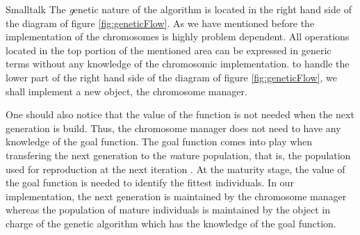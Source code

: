 \begin{displaycode}{Smalltalk}
The {\textsl genetic} nature of the algorithm is located in the right
hand side of the diagram of figure \ref{fig:geneticFlow}. As we
have mentioned before the implementation of the chromosomes is
highly problem dependent. All operations located in the top
portion of the mentioned area can be expressed in generic terms
without any knowledge of the chromosomic implementation. to handle
the lower part of the right hand side of the diagram of figure
\ref{fig:geneticFlow}, we shall implement a new object, the
chromosome manager.

One should also notice that the value of the function is not
needed when the next generation is build. Thus, the chromosome
manager does not need to have any knowledge of the goal function.
The goal function comes into play when transfering the next
generation to the {\textsl mature} population, that is, the population
used for reproduction at the next iteration . At the maturity
stage, the value of the goal function is needed to identify the
fittest individuals. In our implementation, the next generation is
maintained by the chromosome manager whereas the population of
mature individuals is maintained by the object in charge of the
genetic algorithm which has the knowledge of the goal function.


\end{displaycode}
